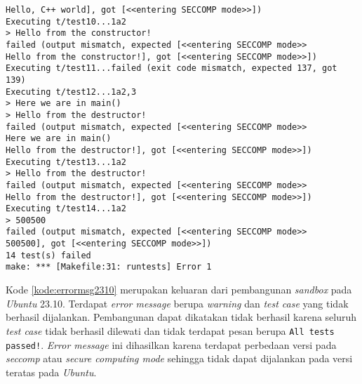 \begin{lstlisting}[caption=\textit{Error message} pembangunan \textit{sandbox} pada \textit{Ubuntu} 23.10, label=kode:errormsg2310]
Hello, C++ world], got [<<entering SECCOMP mode>>])
Executing t/test10...1a2
> Hello from the constructor!
failed (output mismatch, expected [<<entering SECCOMP mode>>
Hello from the constructor!], got [<<entering SECCOMP mode>>])
Executing t/test11...failed (exit code mismatch, expected 137, got 139)
Executing t/test12...1a2,3
> Here we are in main()
> Hello from the destructor!
failed (output mismatch, expected [<<entering SECCOMP mode>>
Here we are in main()
Hello from the destructor!], got [<<entering SECCOMP mode>>])
Executing t/test13...1a2
> Hello from the destructor!
failed (output mismatch, expected [<<entering SECCOMP mode>>
Hello from the destructor!], got [<<entering SECCOMP mode>>])
Executing t/test14...1a2
> 500500
failed (output mismatch, expected [<<entering SECCOMP mode>>
500500], got [<<entering SECCOMP mode>>])
14 test(s) failed
make: *** [Makefile:31: runtests] Error 1
\end{lstlisting}
Kode \ref{kode:errormsg2310} merupakan keluaran dari pembangunan \textit{sandbox} pada \textit{Ubuntu} 23.10. Terdapat \textit{error message} berupa \textit{warning} dan \textit{test case} yang tidak berhasil dijalankan. Pembangunan dapat dikatakan tidak berhasil karena seluruh \textit{test case} tidak berhasil dilewati dan tidak terdapat pesan berupa \texttt{All tests passed!}. \textit{Error message} ini dihasilkan karena terdapat perbedaan versi pada \textit{seccomp} atau \textit{secure computing mode} sehingga tidak dapat dijalankan pada versi teratas pada \textit{Ubuntu}.
